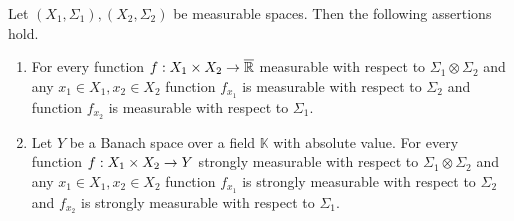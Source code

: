 \begin{proposition}\label{proposition:measurable_functions_have_measurable_sections}
    Let $(X_1,\Sigma_1), (X_2,\Sigma_2)$ be measurable spaces. Then the following assertions hold.
    \begin{enumerate}[label=\emph{\textbf{(\arabic*)}}, leftmargin=*]
        \item For every function $f:X_1\times X_2\rightarrow \overline{{\mathbb R}}$ measurable with respect to $\Sigma_1\otimes \Sigma_2$ and any $x_1\in X_1,x_2\in X_2$ function $f_{x_1}$ is measurable with respect to $\Sigma_2$ and function $f_{x_2}$ is measurable with respect to $\Sigma_1$.
        \item Let $Y$ be a Banach space over a field $\mathbb{K}$ with absolute value. For every function $f:X_1\times X_2\rightarrow Y$ strongly measurable with respect to $\Sigma_1\otimes \Sigma_2$ and any $x_1\in X_1,x_2\in X_2$ function $f_{x_1}$ is strongly measurable with respect to $\Sigma_2$ and $f_{x_2}$ is strongly measurable with respect to $\Sigma_1$.
    \end{enumerate}
\end{proposition}

